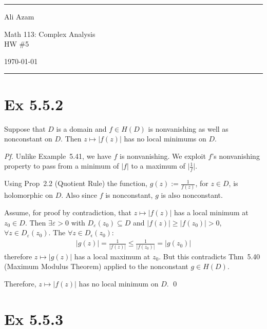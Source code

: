 \documentclass[a4paper]{article}
\begin{document}
\hrule\medskip
\begin{minipage}{0.295\textwidth}\raggedright\footnotesize
Ali Azam
\end{minipage}%
\begin{minipage}{0.4\textwidth}\centering
\large Math 113: Complex Analysis\\
\normalsize HW \#5
\end{minipage}%
\begin{minipage}{0.295\textwidth}\raggedleft
\today
\end{minipage}
\medskip\hrule\bigskip

\section*{Ex 5.5.2}

\begin{tcolorbox}[colback=gray!10, colframe=black, boxrule=0.5pt, arc=2mm]
Suppose that $D$ is a domain and $f \in H(D)$ is nonvanishing as well as nonconstant on $D$. Then $z \mapsto |f(z)|$ has no local minimums on $D$.
\end{tcolorbox}

\textit{Pf.} Unlike Example~5.41, we have $f$ is nonvanishing. We exploit $f$'s nonvanishing property to pass from a minimum of $|f|$ to a maximum of $\displaystyle \big|\frac{1}{f}\big|$.

Using Prop~2.2 (Quotient Rule) the function, $\displaystyle g(z) := \frac{1}{f(z)}$, for $z \in D$,
is holomorphic on $D$. Also since $f$ is nonconstant, $g$ is also nonconstant.

\medskip
Assume, for proof by contradiction, that $z \mapsto |f(z)|$ has a local minimum at $z_0 \in D$. Then $\exists\varepsilon > 0$ with $D_\varepsilon(z_0) \subseteq D$ and $|f(z)| \geq |f(z_0)| > 0$, $\forall z \in D_\varepsilon(z_0)$. The $\forall z \in D_\epsilon(z_0):$
\begin{align*}
|g(z)| = \frac{1}{|f(z)|} \leq \frac{1}{|f(z_0)|} = |g(z_0)|
\end{align*}
therefore $z \mapsto |g(z)|$ has a local maximum at $z_0$. But this contradicts Thm~5.40 (Maximum Modulus Theorem) applied to the nonconstant $g \in H(D)$.

\medskip
Therefore, $z \mapsto |f(z)|$ has no local minimum on $D$. \qed

\newpage
\section*{Ex 5.5.3}
\end{document}
